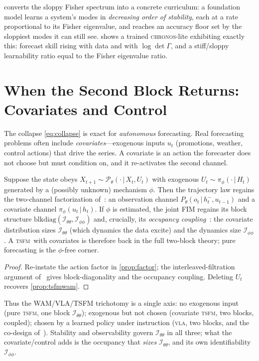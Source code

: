 \documentclass[10pt]{article}
\theoremstyle{plain}
\theoremstyle{definition}
\theoremstyle{remark}
\newcommand{\Fisher}{\mathcal{I}}
\newcommand{\Ith}{\Fisher_{\theta\theta}}
\newcommand{\Iph}{\Fisher_{\phi\phi}}
\newcommand{\Gam}{\Gamma}
\newcommand{\given}{\,\vert\,}
\newcommand{\wm}{P_{\theta}}
\newcommand{\TSFM}{\textsc{tsfm}}
\newcommand{\VLA}{\textsc{vla}}
\newcommand{\Chronos}{\textsc{chronos}}
\begin{document}
 converts the sloppy Fisher spectrum into a concrete curriculum:
a foundation model learns a system's modes in \emph{decreasing order of stability},
each at a rate proportional to its Fisher eigenvalue, and reaches an accuracy
floor set by the sloppiest modes it can still see.  shows a
trained \Chronos-lite exhibiting exactly this: forecast skill rising with data and
with $\log\det\Gam$, and a stiff/sloppy learnability ratio equal to the Fisher
eigenvalue ratio.

\section{When the Second Block Returns: Covariates and Control}
\label{sec:covariates}

The collapse \eqref{eq:collapse} is exact for \emph{autonomous} forecasting.
Real forecasting problems often include \emph{covariates}---exogenous inputs
$u_t$ (promotions, weather, control actions) that drive the series. A covariate
is an action the forecaster does not choose but must condition on, and it
re-activates the second channel.

\begin{proposition}\label{prop:covariate}
Suppose the state obeys $X_{t+1}\sim\mathcal P_\theta(\cdot\given X_t,U_t)$ with
exogenous $U_t\sim\pi_\phi(\cdot\given H_t)$ generated by a (possibly unknown)
mechanism $\phi$. Then the trajectory law regains the two-channel factorization
of~\cite[Prop.~2.1]{wamvla}: an observation channel $\wm(o_t\given h_t^-,u_{t-1})$
and a covariate channel $\pi_\phi(u_t\given h_t)$. If $\phi$ is estimated, the
joint FIM regains its block structure $\mathrm{blkdiag}(\Ith,\Iph)$ and, crucially,
its \emph{occupancy coupling}~\cite[Prop.~6.3]{wamvla}: the covariate
distribution sizes $\Ith$ (which dynamics the data excite) and the dynamics size
$\Iph$. A \TSFM\ with covariates is therefore back in the full two-block theory;
pure forecasting is the $\phi$-free corner.
\end{proposition}
\begin{proof}
Re-instate the action factor in \cref{prop:factor}; the interleaved-filtration
argument of~\cite[Thm.~6.1]{wamvla} gives block-diagonality and
\cite[Prop.~6.3]{wamvla} the occupancy coupling. Deleting $U_t$ recovers
\cref{prop:tsfmwam}.
\end{proof}

Thus the WAM/VLA/TSFM trichotomy is a single axis: no exogenous input (pure
\TSFM, one block $\Ith$); exogenous but not chosen (covariate \TSFM, two blocks,
coupled); chosen by a learned policy under instruction (\VLA, two blocks, and the
co-design of~\cite[\S6]{wamvla}). Stability and observability govern $\Ith$ in
all three; what the covariate/control adds is the occupancy that \emph{sizes}
$\Ith$, and its own identifiability $\Iph$.
\end{document}
